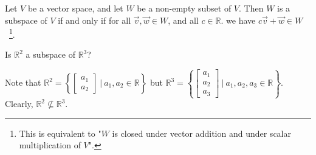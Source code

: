 \documentclass[11pt,fleqn]{book} %
\begin{document}
\setcounter{section}{2}
\setcounter{dummy}{7}
\begin{theorem}
    Let $V$ be a vector space, and let $W$ be a non-empty subset of $V$. Then $W$ is a subspace of $V$ if and only if for all $\overrightarrow{v}, \overrightarrow{w} \in W$, and all $c \in \mathbb{R}$. we have $c\overrightarrow{v} + \overrightarrow{w} \in W$~\footnote{This is equivalent to "$W$ is closed under vector addition and under scalar multiplication of $V$". }.
\end{theorem}
\setcounter{section}{3}

\begin{example}
    Is $\mathbb{R}^2$ a subspace of $\mathbb{R}^3$? 
    
    Note that $\mathbb{R}^2 = \left\{ \begin{bmatrix}a _1 \\ a_2 \end{bmatrix} ~|~ a_1,a_2 \in \mathbb{R} \right\}$ but $\mathbb{R}^3 = \left\{ \begin{bmatrix}a _1 \\ a_2 \\ a_3 \end{bmatrix} ~|~ a_1,a_2,a_3 \in \mathbb{R} \right\}$. Clearly, $\mathbb{R}^2 \not\subseteq \mathbb{R}^3$. 
\end{example}
\end{document}

